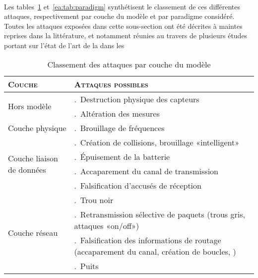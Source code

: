         \paragraph{}
Les tables~\ref{ea:tab:layer} et~\ref{ea:tab:paradigm} synthétisent le classement de ces différentes attaques, respectivement par couche du modèle \tcpip et par paradigme considéré.
Toutes les attaques exposées dans cette sous-section ont été décrites à maintes reprises dans la littérature, et notamment réunies au travers de plusieurs études portant sur l'état de l'art de la \secu dans les \rcs~\cite{SSS11,RM11,AD14}
\begin{table}[!ht]
    \setcounter{LayerNumber}{1}
    \newcommand\num[1]{\theLayerNumber.~#1\stepcounter{LayerNumber}}
    \caption{Classement des attaques par couche du modèle \tcpip}\label{ea:tab:layer}
    \centering
    \medskip
    \begin{small}
        \begin{tabular}{m{}|p{}}
            \toprule
            \textsc{Couche} & \textsc{Attaques possibles}\\
            \midrule
            \multirow{2}{*}{Hors modèle}%
                & \num{Destruction physique des capteurs}\\
                & \num{Altération des mesures}\\
            \midrule
            \multirow{1}{*}{Couche physique}%
                & \num{Brouillage de fréquences}\\
            \midrule
            \multirow{4}{*}{\parbox{.2\textwidth}{Couche liaison de données}}%
                & \num{Création de collisions, brouillage «intelligent»}\\
                & \num{Épuisement de la batterie}\\
                & \num{Accaparement du canal de transmission}\\
                & \num{Falsification d'accusés de réception}\\
            \midrule
            \multirow{8}{*}{Couche réseau}%
                & \num{Trou noir}\\
                & \num{Retransmission sélective de paquets (trous gris, attaques «on/off»)}\\
                & \num{Falsification des informations de routage (accaparement du canal, création de boucles, \etc)}\\
                & \num{Puits}\\

\end{tabular}
\end{small}
\end{table}

